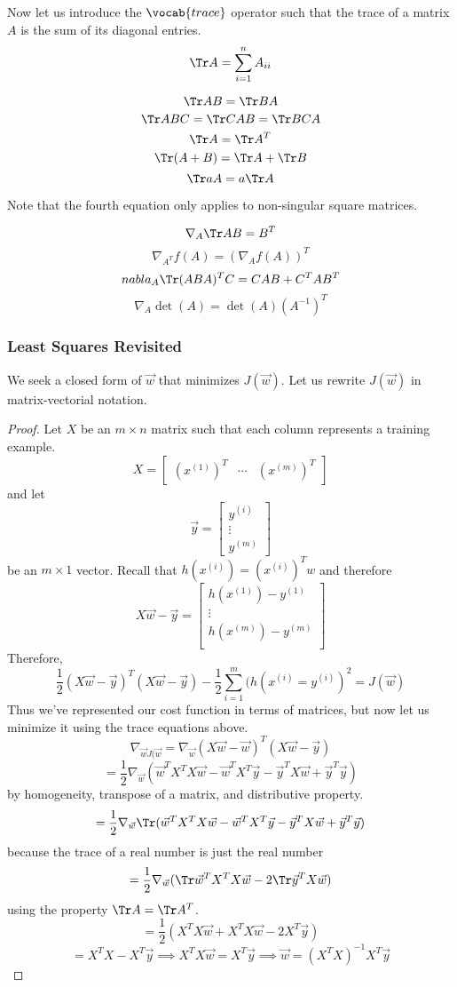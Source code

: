 \documentclass[12pt]{scrartcl}
\begin{document}
Now let us introduce the $\vocab{trace}$ operator such that the trace of a matrix $A$ is the sum of its diagonal entries.
\[\Tr A = \sum_{i=1}^n A_{ii}\]
\begin{lemma}
    \[\Tr AB = \Tr BA\]
    \[\Tr ABC = \Tr CAB = \Tr BCA\]
    \[\Tr A = \Tr A^T\]
    \[\Tr(A + B) = \Tr A + \Tr B\]
    \[\Tr a A = a \Tr A\]
\end{lemma}
Note that the fourth equation only applies to non-singular square matrices.
\begin{lemma}
\[\nabla_A \Tr AB = B^T\]
\[\nabla_{A^T}f(A) = (\nabla_A f(A))^T\]
\[nabla_A \Tr (ABA)^TC = CAB + C^TAB^T\]
\[\nabla_A \det(A) = \det(A)(A^{-1})^T\]
\end{lemma}

\subsubsection{Least Squares Revisited}

We seek a closed form of $\vec{w}$ that minimizes $J(\vec{w})$. Let us rewrite $J(\vec{w})$ in matrix-vectorial notation.

\begin{proof}
    Let $X$ be an $m \times n$ matrix such that each column represents a training example.
    \[X = \begin{bmatrix}
        (x^{(1)})^T & \cdots & (x^{(m)})^T
    \end{bmatrix}\] and let \[\vec{y} = \begin{bmatrix}
        y^{(i)} \\
        \vdots \\
        y^{(m)}
    \end{bmatrix}\]
    be an $m \times 1$ vector.
Recall that $h(x^{(i)}) = (x^{(i)})^Tw$ and therefore
\[X\vec{w} - \vec{y} = \begin{bmatrix}
    h(x^{(1)}) - y^{(1)}\\
    \vdots\\
    h(x^{(m)}) - y^{(m)}\\
\end{bmatrix}\]
Therefore,
\[\frac{1}{2}(X\vec{w}-\vec{y})^T(X\vec{w} - \vec{y}) - \frac{1}{2}\sum_{i=1}^m (h(x^{(i)} = y^{(i)})^2 = J(\vec{w})\]
Thus we've represented our cost function in terms of matrices, but now let us minimize it using the trace equations above.
\[\nabla_{\vec{w}J(\vec{w}} = \nabla_{\vec{w}}(X\vec{w} - \vec{w})^T(X\vec{w} - \vec{y})\]
\[ = \frac{1}{2}\nabla_{\vec{w}} (\vec{w}^TX^T X\vec{w} - \vec{w}^T X^T \vec{y} -\vec{y}^TX\vec{w} + \vec{y}^T\vec{y})\]
by homogeneity, transpose of a matrix, and distributive property.
\[= \frac{1}{2}\nabla_{\vec{w}} \Tr (\vec{w}^TX^T X\vec{w} - \vec{w}^T X^T \vec{y} -\vec{y}^TX\vec{w} + \vec{y}^T\vec{y})\] because the trace of a real number is just the real number
\[= \frac{1}{2}\nabla_{\vec{w}}(\Tr \vec{w}^TX^TX\vec{w} - 2\Tr\vec{y}^TX\vec{w})\]
using the property $\Tr A = \Tr A^T$.
\[= \frac{1}{2}(X^TX\vec{w} + X^TX\vec{w} - 2X^T\vec{y})\]
\[= X^TX - X^T\vec{y} \implies X^TX\vec{w} = X^T\vec{y} \implies \vec{w} = (X^TX)^{-1}X^T\vec{y}\]
\end{proof}
\end{document}
